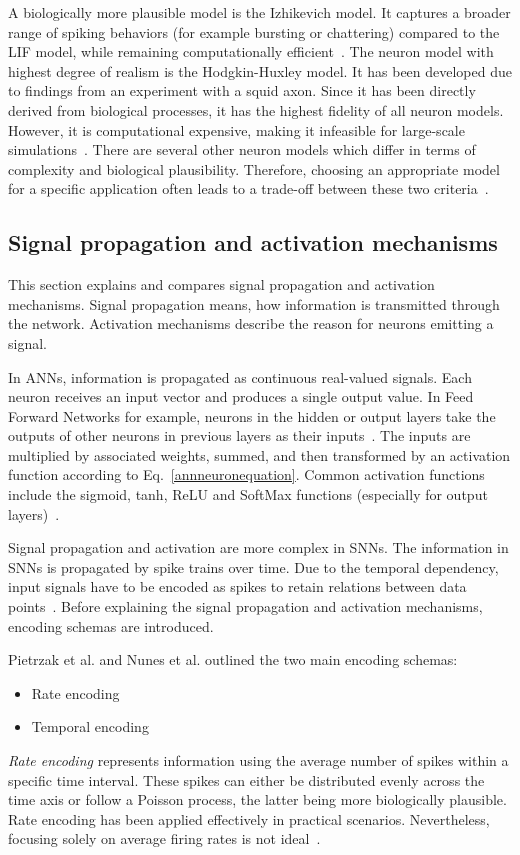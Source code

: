 A biologically more plausible model is the Izhikevich model.
It captures a broader range of spiking behaviors (for example bursting or chattering) compared to the \ac{LIF} model, while remaining computationally efficient~\cite{pietrzak_overview_2023}.
The neuron model with highest degree of realism is the Hodgkin-Huxley model.
It has been developed due to findings from an experiment with a squid axon.
Since it has been directly derived from biological processes, it has the highest fidelity of all neuron models.
However, it is computational expensive, making it infeasible for large-scale simulations~\cite{pietrzak_overview_2023}.
There are several other neuron models which differ in terms of complexity and biological plausibility. 
Therefore, choosing an appropriate model for a specific application often leads to a trade-off between these two criteria~\cite{yamazaki_spiking_2022}.

\subsection{Signal propagation and activation mechanisms} \label{Subsec:SignalPropagationAndActivationMechanisms}
This section explains and compares signal propagation and activation mechanisms.
Signal propagation means, how information is transmitted through the network.
Activation mechanisms describe the reason for neurons emitting a signal.

In \acp{ANN}, information is propagated as continuous real-valued signals.
Each neuron receives an input vector and produces a single output value. 
In Feed Forward Networks for example, neurons in the hidden or output layers take the outputs of other neurons in previous layers as their inputs~\cite[p.~164]{goodfellow_deep_2016}.
The inputs are multiplied by associated weights, summed, and then transformed by an activation function according to Eq.~\ref{annneuronequation}. 
Common activation functions include the sigmoid, tanh, \ac{ReLU} and SoftMax functions (especially for output layers)~\cite{taye_understanding_2023}. 

Signal propagation and activation are more complex in \acp{SNN}.
The information in \acp{SNN} is propagated by spike trains over time.
Due to the temporal dependency, input signals have to be encoded as spikes to retain relations between data points~\cite{pietrzak_overview_2023}.
Before explaining the signal propagation and activation mechanisms, encoding schemas are introduced.

Pietrzak et al. and Nunes et al. outlined the two main encoding schemas:
\begin{itemize}
    \item Rate encoding
    \item Temporal encoding
\end{itemize}
\textit{Rate encoding} represents information using the average number of spikes within a specific time interval.
These spikes can either be distributed evenly across the time axis or follow a Poisson process, the latter being more biologically plausible.
Rate encoding has been applied effectively in practical scenarios.
Nevertheless, focusing solely on average firing rates is not ideal~\cite{pietrzak_overview_2023,nunes_spiking_2022}.

